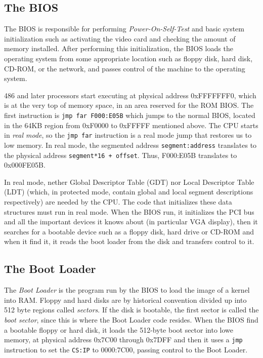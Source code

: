 \subsection{The BIOS}
The BIOS is responsible for performing \emph{Power-On-Self-Test} and basic system initialization such as activating the video card and checking the amount of memory installed. After performing this initialization, the BIOS loads the operating system from some appropriate location such as floppy disk, hard disk, CD-ROM, or the network, and passes control of the machine to the operating system.

486 and later processors start executing at physical address 0xFFFFFFF0, which is at the very top of memory space, in an area reserved for the ROM BIOS. The first instruction is \texttt{jmp far F000:E05B} which jumps to the normal BIOS, located in the 64KB region from 0xF0000 to 0xFFFFF mentioned above. The CPU starts in \emph{real mode}, so the \texttt{jmp far} instruction is a real mode jump that restores us to low memory. In real mode, the segmented address \texttt{segment:address} translates to the physical address \texttt{segment*16 + offset}. Thus, F000:E05B translates to 0x000FE05B.

In real mode, nether Global Descriptor Table (GDT) nor Local Descriptor Table (LDT) (which, in protected mode, contain global and local segment descriptions respectively) are needed by the CPU. The code that initializes these data structures must run in real mode. When the BIOS run, it initializes the PCI bus and all the important devices it knows about (in particular VGA display), then it searches for a bootable device such as a floppy disk, hard drive or CD-ROM and when it find it, it reads the boot loader from the disk and transfers control to it.

\subsection{The Boot Loader}
The \emph{Boot Loader} is the program run by the BIOS to load the image of a kernel into RAM. Floppy and hard disks are by historical convention divided up into 512 byte regions called \emph{sectors}. If the disk is bootable, the first sector is called the \emph{boot sector}, since this is where the Boot Loader code resides. When the BIOS find a bootable floppy or hard disk, it loads the 512-byte boot sector into lowe memory, at physical address 0x7C00 through 0x7DFF and then it uses a \texttt{jmp} instruction to set the \texttt{CS:IP} to 0000:7C00, passing control to the Boot Loader.

